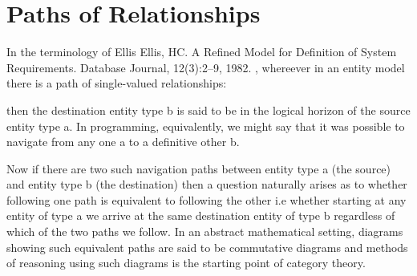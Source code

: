 


\section{Paths of Relationships}
\label{PathsofRelationships}


\mynote
In the terminology of Ellis Ellis, HC. A Refined Model for Definition of System Requirements. Database Journal, 12(3):2--9, 1982. , whereever in an entity model there is a path of single-valued relationships:
\begin{center}

\end{center}
then the destination entity type b is said to be in the logical horizon of the source entity type a. In programming, equivalently, we might say that it was possible to navigate from any one a to a definitive other b. 


\mynote
Now if there are two such navigation paths between entity type a (the source) and entity type b (the destination) then a question naturally arises as to whether following one path is equivalent to following the other i.e whether starting at any entity of type a we arrive at the same destination entity of type b regardless of which of the two paths we follow. In an abstract mathematical setting, diagrams showing such equivalent paths are said to be commutative diagrams and methods of reasoning using such diagrams is the starting point of category theory.


